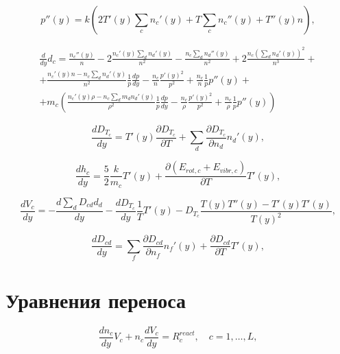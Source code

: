 \documentclass[12pt]{article}
\begin{document}
\begin{equation}
  p''(y) = k \left(2T'(y)\sum_{c} n_{c}'(y) + T\sum_{c} n_{c}''(y) +  T''(y)n\right),
\end{equation}

\begin{multline}
  \frac{d}{dy}d_{c} = \frac{n_{c}''(y)}{n} - 2\frac{n_{c}'(y)\sum_{d}n_{d}'(y)}{n^2} - \frac{n_{c}\sum_{d}n_{d}''(y)}{n^2} + 2\frac{n_{c}\left(\sum_{d}n_{d}'(y) \right)^2}{n^3} + \\
  + \frac{n_{c}'(y)n - n_{c}\sum_{d}n_{d}'(y)}{n^2} \frac{1}{p} \frac{dp}{dy} - \frac{n_{c}}{n} \frac{p'(y)^2}{p^2} + \frac{n_{c}}{n} \frac{1}{p}p''(y) + \\
  + m_{c} \left(\frac{n_{c}'(y)\rho - n_{c}\sum_{d}m_{d}n_{d}'(y)}{\rho^2} \frac{1}{p} \frac{dp}{dy} - \frac{n_{c}}{\rho} \frac{p'(y)^2}{p^2} + \frac{n_{c}}{\rho} \frac{1}{p}p''(y) \right)
\end{multline}

\begin{equation}
  \frac{d D_{T_{c}}}{d y} = T'(y) \frac{\partial D_{T_{c}}}{\partial T} + \sum_{d} \frac{\partial D_{T_{c}}}{\partial n_{d}} n_{d}'(y),
\end{equation}

\begin{equation}
  \frac{d h_{c}}{d y} = \frac{5}{2} \frac{k}{m_{c}}T'(y) + \frac{\partial \left(E_{rot,c} + E_{vibr,c} \right)}{\partial T}T'(y),
\end{equation}

\begin{equation}
  \frac{d V_{c}}{dy} = -\frac{d \sum_{d}D_{cd}d_{d}}{dy} - \frac{d D_{T_{c}}}{d y} \frac{1}{T} T'(y) - D_{T_{c}} \frac{T(y)T''(y) - T'(y)T'(y)}{T(y)^2},
\end{equation}

\begin{equation}
  \frac{d D_{cd}}{dy} = \sum_{f}\frac{\partial D_{cd}}{\partial n_{f}}n_{f}'(y) + \frac{\partial D_{cd}}{\partial T}T'(y),
\end{equation}

\section{Уравнения переноса}

\begin{equation}
  \frac{d n_{c}}{d y} V_{c} + n_{c}\frac{d V_{c}}{d y} = R_{c}^{react},\quad c=1,\ldots,L,\label{densityeqn}
\end{equation}
\end{document}
